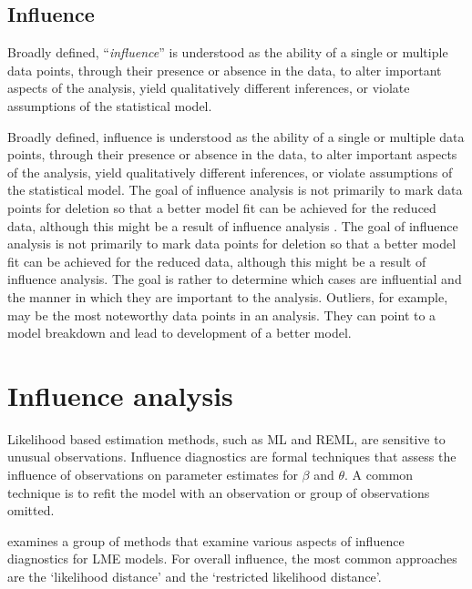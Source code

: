 \documentclass[12pt, a4paper]{article}
\begin{document}
			
			
			
			
			
			
			
			\subsection{Influence}
			Broadly
			defined, ``\textit{influence}” is understood as the ability of a single or multiple data points, through their presence
			or absence in the data, to alter important aspects of the analysis, yield qualitatively different inferences, or
			violate assumptions of the statistical model. 
			
			Broadly defined, influence is understood as the ability of a single or multiple data points, through their presence or absence in the data, to alter important aspects of the analysis, yield qualitatively different inferences, or violate assumptions of the statistical model. The goal of influence analysis is not primarily to mark data
			points for deletion so that a better model fit can be achieved for the reduced data, although this might be a result of influence analysis \citep{schabenberger}.			
			The goal of influence analysis is not primarily to mark data
			points for deletion so that a better model fit can be achieved for the reduced data, although this might be a
			result of influence analysis. The goal is rather to determine which cases are influential and the manner in
			which they are important to the analysis. Outliers, for example, may be the most noteworthy data points in
			an analysis. They can point to a model breakdown and lead to development of a better model.
			
			
			\newpage
			\section{Influence analysis} %
			
			Likelihood based estimation methods, such as ML and REML, are sensitive to unusual observations. Influence diagnostics are formal techniques that assess the influence of observations on parameter estimates for $\beta$ and $\theta$. A common technique is to refit the model with an observation or group of observations omitted.
			
			\citet{west} examines a group of methods that examine various aspects of influence diagnostics for LME models.
			For overall influence, the most common approaches are the `likelihood distance' and the `restricted likelihood distance'.
			
\end{document}
